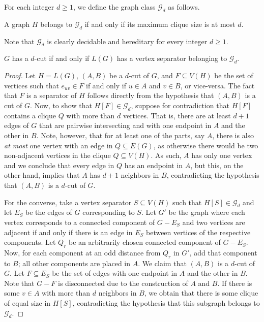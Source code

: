 \documentclass[a4paper,UKenglish,cleveref, autoref]{lipics-v2019}
\newcommand{\ig}[1]{\textcolor{red}{[Ig: #1]}}
\begin{document}
For each integer $d \geq 1$, we define the graph class $\mathcal{G}_d$ as follows.

\begin{definition}
    A graph $H$ belongs to $\mathcal{G}_d$ if and only if its maximum clique size is at most $d$.
\end{definition}

Note that $\mathcal{G}_d$ is clearly decidable and hereditary for every integer $d \geq 1$.


\begin{lemma}
    \label{lem:cut_mincut}
    $G$ has a $d$-cut if and only if $L(G)$ has a vertex separator belonging to $\mathcal{G}_d$.
\end{lemma}

\begin{proof}
    Let $H = L(G)$, $(A, B)$ be a $d$-cut of $G$, and $F \subseteq V(H)$ be the set of vertices such that $e_{uv} \in F$ if and only if $u \in A$ and $v \in B$, or vice-versa.
    The fact that $F$ is a separator of $H$ follows directly from the hypothesis that $(A, B)$ is a cut of $G$.
    Now, to show that $H[F] \in \mathcal{G}_d$, suppose for contradiction that $H[F]$ contains a  clique $Q$ with more than $d$ vertices.
    That is, there are at least $d+1$ edges of $G$ that are pairwise intersecting and with one endpoint in $A$ and the other in $B$.
    Note, however, that for at least one of the parts, say $A$, there is also {\sl at most} one vertex with an edge in $Q \subseteq E(G)$, as otherwise there would be two non-adjacent vertices in the clique $Q \subseteq V(H)$.
    As such, $A$ has only one vertex and we conclude that every edge in $Q$ has an endpoint in $A$, but this, on the other hand, implies that $A$ has $d+1$ neighbors in $B$, contradicting the hypothesis that $(A, B)$ is a $d$-cut of $G$.


    For the converse, take a vertex separator $S \subseteq V(H)$ such that $H[S] \in \mathcal{G}_d$ and let $E_S$ be the edges of $G$ corresponding to $S$.
    Let $G'$ be the graph where each vertex corresponds to a connected component of $G - E_S$ and two vertices are adjacent if and only if there is an edge in $E_S$ between vertices of the respective components.
    Let $Q_r$ be an arbitrarily chosen connected component of $G - E_S$.
    Now, for each component at an odd distance from $Q_r$ in $G'$, add that component to $B$; all other components are placed in $A$.
    We claim that $(A, B)$ is a $d$-cut of $G$. Let $F \subseteq E_S$ be the set of edges with one endpoint in $A$ and the other in $B$.
    Note that $G - F$ is disconnected due to the construction of $A$ and $B$.
    If there is some $v \in A$ with more than $d$ neighbors in $B$, we obtain that there is some clique of equal size in $H[S]$, contradicting the hypothesis that this subgraph belongs to $\mathcal{G}_d$.
\end{proof}
\end{document}
